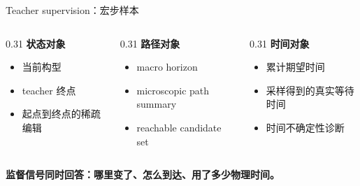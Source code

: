 \documentclass[aspectratio=43,10pt]{beamer}
\newcommand{\hl}[1]{\textcolor{thuPurple}{\textbf{#1}}}
\newcommand{\tightitems}{\setlength{\itemsep}{0.35em}}
\begin{document}
\begin{frame}{Teacher supervision：宏步样本}
  \begin{columns}[T,onlytextwidth]
    \begin{column}{0.31\textwidth}
      \textbf{状态对象}
      \begin{itemize}
        \tightitems
        \item 当前构型
        \item teacher 终点
        \item 起点到终点的稀疏编辑
      \end{itemize}
    \end{column}
    \begin{column}{0.31\textwidth}
      \textbf{路径对象}
      \begin{itemize}
        \tightitems
        \item macro horizon
        \item microscopic path summary
        \item reachable candidate set
      \end{itemize}
    \end{column}
    \begin{column}{0.31\textwidth}
      \textbf{时间对象}
      \begin{itemize}
        \tightitems
        \item 累计期望时间
        \item 采样得到的真实等待时间
        \item 时间不确定性诊断
      \end{itemize}
    \end{column}
  \end{columns}
  \vspace{0.65cm}
  \begin{center}
    \large \hl{监督信号同时回答：哪里变了、怎么到达、用了多少物理时间。}
  \end{center}
\end{frame}
\end{document}
